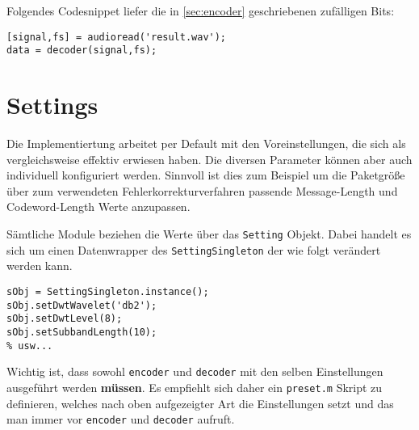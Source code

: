 Folgendes Codesnippet liefer die in \ref{sec:encoder} geschriebenen zufälligen Bits:

\begin{verbatim}
[signal,fs] = audioread('result.wav');
data = decoder(signal,fs);
\end{verbatim}


\section{Settings}

Die Implementiertung arbeitet per Default mit den Voreinstellungen, die sich als vergleichsweise effektiv erwiesen haben. Die diversen Parameter können aber auch individuell konfiguriert werden. Sinnvoll ist dies zum Beispiel um die Paketgröße über zum verwendeten Fehlerkorrekturverfahren passende Message-Length und Codeword-Length Werte anzupassen.

Sämtliche Module beziehen die Werte über das \texttt{Setting} Objekt. Dabei handelt es sich um einen Datenwrapper des \texttt{SettingSingleton} der wie folgt verändert werden kann. 

\begin{verbatim}
sObj = SettingSingleton.instance();
sObj.setDwtWavelet('db2');
sObj.setDwtLevel(8);
sObj.setSubbandLength(10);
% usw...
\end{verbatim}

Wichtig ist, dass sowohl \texttt{encoder} und \texttt{decoder} mit den selben Einstellungen ausgeführt werden \textbf{müssen}. Es empfiehlt sich daher ein \texttt{preset.m} Skript zu definieren, welches nach oben aufgezeigter Art die Einstellungen setzt und das man immer vor \texttt{encoder} und \texttt{decoder} aufruft. 









